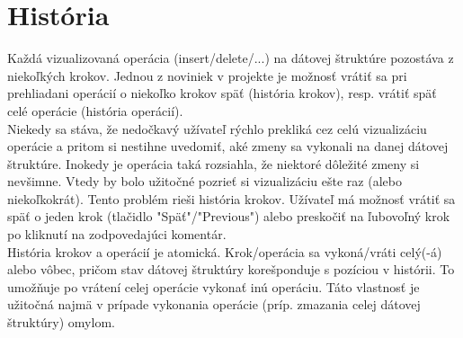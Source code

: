 \section{História}
Každá vizualizovaná operácia (insert/delete/...) na dátovej štruktúre pozostáva z niekoľkých krokov. Jednou z noviniek v projekte je možnosť vrátiť sa pri prehliadani operácií o niekoľko krokov späť (história krokov), resp. vrátiť späť celé operácie (história operácií).\\
Niekedy sa stáva, že nedočkavý užívateľ rýchlo prekliká cez celú vizualizáciu operácie a pritom si nestihne uvedomiť, aké zmeny sa vykonali na danej dátovej štruktúre. Inokedy je operácia taká rozsiahla, že niektoré dôležité zmeny si nevšimne. Vtedy by bolo užitočné pozrieť si vizualizáciu ešte raz (alebo niekoľkokrát). Tento problém rieši história krokov. Užívateľ má možnosť vrátiť sa späť o jeden krok (tlačidlo "Späť"/"Previous") alebo preskočiť na ľubovoľný krok po kliknutí na zodpovedajúci komentár. \\
História krokov a operácií je atomická. Krok/operácia sa vykoná/vráti celý(-á) alebo vôbec, pričom stav dátovej štruktúry korešponduje s pozíciou v histórii. To umožňuje po vrátení celej operácie vykonať inú operáciu. Táto vlastnosť je užitočná najmä v prípade vykonania operácie (príp. zmazania celej dátovej štruktúry) omylom.

